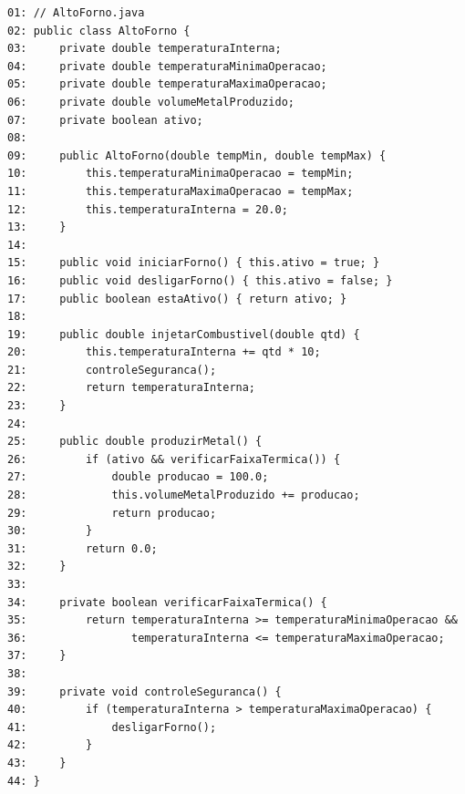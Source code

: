 \documentclass[12pt,a4paper]{article}
\begin{document}
\begin{enumerate}
\begin{center}
    \end{center}
\begin{small}
\begin{lstlisting}
01: // AltoForno.java
02: public class AltoForno {
03:     private double temperaturaInterna;
04:     private double temperaturaMinimaOperacao;
05:     private double temperaturaMaximaOperacao;
06:     private double volumeMetalProduzido;
07:     private boolean ativo;
08: 
09:     public AltoForno(double tempMin, double tempMax) {
10:         this.temperaturaMinimaOperacao = tempMin;
11:         this.temperaturaMaximaOperacao = tempMax;
12:         this.temperaturaInterna = 20.0;
13:     }
14: 
15:     public void iniciarForno() { this.ativo = true; }
16:     public void desligarForno() { this.ativo = false; }
17:     public boolean estaAtivo() { return ativo; }
18: 
19:     public double injetarCombustivel(double qtd) {
20:         this.temperaturaInterna += qtd * 10;
21:         controleSeguranca();
22:         return temperaturaInterna;
23:     }
24: 
25:     public double produzirMetal() {
26:         if (ativo && verificarFaixaTermica()) {
27:             double producao = 100.0;
28:             this.volumeMetalProduzido += producao;
29:             return producao;
30:         }
31:         return 0.0;
32:     }
33: 
34:     private boolean verificarFaixaTermica() {
35:         return temperaturaInterna >= temperaturaMinimaOperacao && 
36:                temperaturaInterna <= temperaturaMaximaOperacao;
37:     }
38: 
39:     private void controleSeguranca() {
40:         if (temperaturaInterna > temperaturaMaximaOperacao) {
41:             desligarForno();
42:         }
43:     }
44: }
\end{lstlisting}
\end{small}


\end{enumerate}
\end{document}
